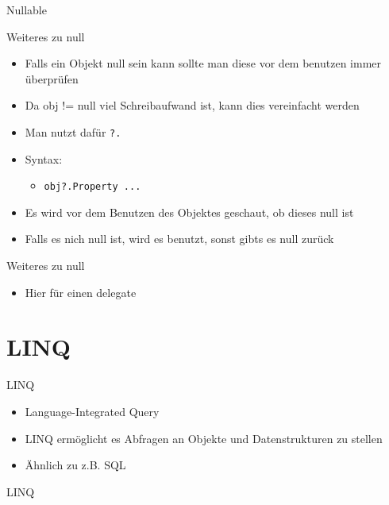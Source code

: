 \begin{frame}{Nullable}
		
\end{frame}

\begin{frame}{Weiteres zu null}
	\begin{itemize}
		\item Falls ein Objekt \alert{null} sein kann sollte man diese vor dem benutzen immer überprüfen
		\item Da \alert{obj != null} viel Schreibaufwand ist, kann dies vereinfacht werden	
	\end{itemize}
	\begin{itemize}
		\item Man nutzt dafür \texttt{\alert{?.}}
		\item Syntax:
		\begin{itemize}
			\item \texttt{obj\alert{?.}Property ...}
		\end{itemize}
		\item Es wird vor dem Benutzen des Objektes geschaut, ob dieses \alert{null} ist
		\item Falls es nich \alert{null} ist, wird es benutzt, sonst gibts es \alert{null} zurück
	\end{itemize}
\end{frame}

\begin{frame}{Weiteres zu null}
	
	\begin{itemize}
		\item Hier für einen \alert{delegate}
	\end{itemize}		
		
\end{frame}

\section{LINQ}
\begin{frame}{LINQ}
	\begin{itemize}
		\item Language-Integrated Query
		\item LINQ ermöglicht es Abfragen an Objekte und Datenstrukturen zu stellen
		\item Ähnlich zu z.B. SQL
	\end{itemize}
\end{frame}

\begin{frame}{LINQ}
		
\end{frame}


